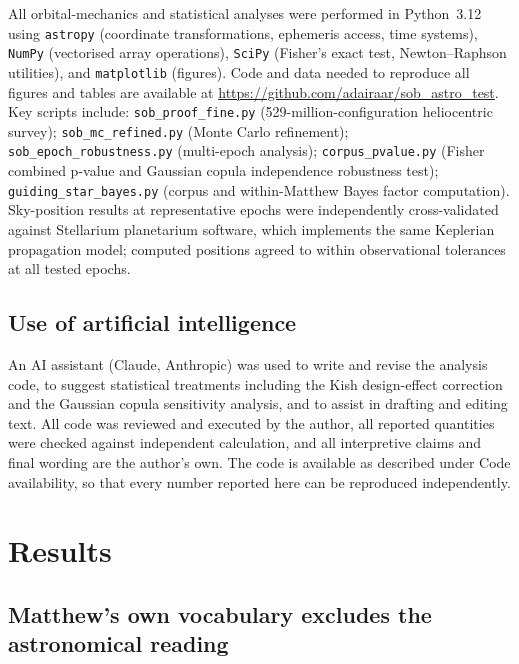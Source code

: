 \documentclass[sn-nature]{sn-jnl}
\begin{document}
All orbital-mechanics and statistical analyses were performed in Python~3.12
using \texttt{astropy}\cite{astropy2022} (coordinate transformations,
ephemeris access, time systems), \texttt{NumPy}\cite{harris2020} (vectorised
array operations), \texttt{SciPy}\cite{virtanen2020} (Fisher's exact test,
Newton--Raphson utilities), and \texttt{matplotlib}\cite{hunter2007}
(figures). Code and data needed to reproduce all figures and tables are
available at \url{https://github.com/adairaar/sob_astro_test}. Key scripts include:
\texttt{sob\_proof\_fine.py} (529-million-configuration heliocentric survey);
\texttt{sob\_mc\_refined.py} (Monte Carlo refinement);
\texttt{sob\_epoch\_robustness.py} (multi-epoch analysis);
\texttt{corpus\_pvalue.py} (Fisher combined p-value and Gaussian copula independence robustness test);
\texttt{guiding\_star\_bayes.py} (corpus and within-Matthew Bayes factor computation).
Sky-position results at representative epochs were independently cross-validated
against Stellarium planetarium software\cite{stellarium2021}, which implements
the same Keplerian propagation model; computed positions agreed to within
observational tolerances at all tested epochs.

\subsection{Use of artificial intelligence}

An AI assistant (Claude, Anthropic) was used to write and revise the analysis
code, to suggest statistical treatments including the Kish design-effect
correction and the Gaussian copula sensitivity analysis, and to assist in
drafting and editing text. All code was reviewed and executed by the author,
all reported quantities were checked against independent calculation, and all
interpretive claims and final wording are the author's own. The code is
available as described under Code availability, so that every number reported
here can be reproduced independently.

\section{Results}\label{sec:results}

\subsection{Matthew's own vocabulary excludes the astronomical reading}
\label{subsec:within_matthew_results}
\end{document}
